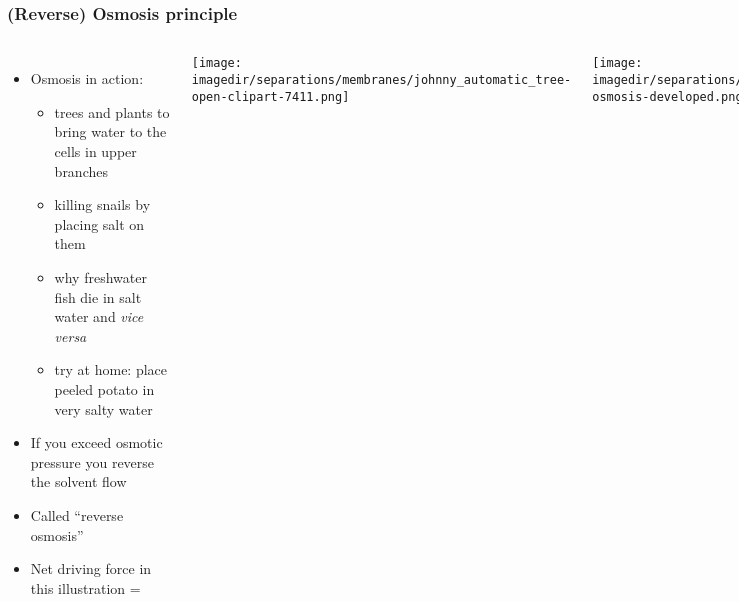 \begin{frame}\frametitle{(Reverse) Osmosis principle}
	\begin{columns}[t]
			\begin{itemize}
				\item	Osmosis in action:
				\begin{itemize}
					\item	trees and plants to bring water to the cells in upper branches
					\item	killing snails by placing salt on them
					\item	why freshwater fish die in salt water and \emph{vice versa}
					\item	try at home: place peeled potato in very salty water  %
				\end{itemize}
				\item	If you exceed osmotic pressure you reverse the solvent flow
				\item	Called ``reverse osmosis''
				\item	Net driving force in this illustration = \underline{$\qquad\qquad\qquad\qquad\qquad$}  %
			\end{itemize}
			\vspace{-1cm}
			\begin{center}
				\texttt{[image: \\imagedir/separations/membranes/johnny\_automatic\_tree-open-clipart-7411.png]}
			\end{center}
			\begin{center}
				\texttt{[image: \\imagedir/separations/membranes/reverse-osmosis-developed.png]}
			\end{center}
	\end{columns}
\end{frame}

